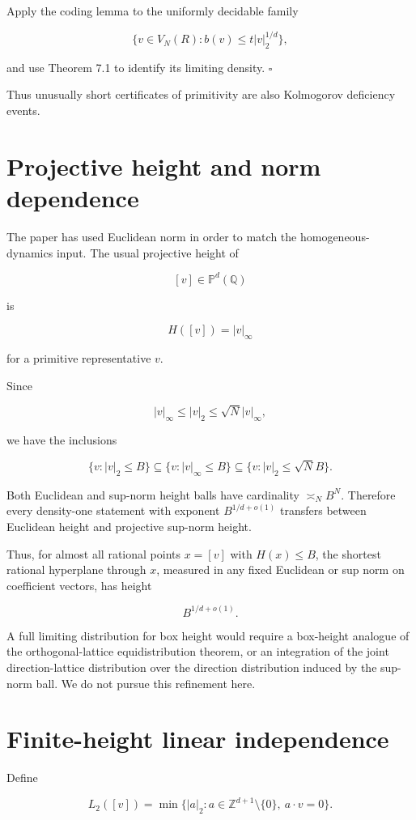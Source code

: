 \documentclass[11pt]{article}
\begin{document}
Apply the coding lemma to the uniformly decidable family

\[
\{v\in V_N(R):b(v)\le t|v|_2^{1/d}\},
\]

and use Theorem 7.1 to identify its limiting density. $\square$

Thus unusually short certificates of primitivity are also Kolmogorov deficiency events.

\section{Projective height and norm dependence}

The paper has used Euclidean norm in order to match the homogeneous-dynamics input. The usual projective height of

\[
[v]\in\mathbb P^d(\mathbb Q)
\]

is

\[
H([v])=|v|_\infty
\]

for a primitive representative $v$.

Since

\[
|v|_\infty\le |v|_2\le \sqrt N|v|_\infty,
\]

we have the inclusions

\[
\{v:|v|_2\le B\}
\subseteq
\{v:|v|_\infty\le B\}
\subseteq
\{v:|v|_2\le \sqrt N B\}.
\]

Both Euclidean and sup-norm height balls have cardinality $\asymp_N B^N$. Therefore every density-one statement with exponent $B^{1/d+o(1)}$ transfers between Euclidean height and projective sup-norm height.

Thus, for almost all rational points $x=[v]$ with $H(x)\le B$, the shortest rational hyperplane through $x$, measured in any fixed Euclidean or sup norm on coefficient vectors, has height

\[
B^{1/d+o(1)}.
\]

A full limiting distribution for box height would require a box-height analogue of the orthogonal-lattice equidistribution theorem, or an integration of the joint direction-lattice distribution over the direction distribution induced by the sup-norm ball. We do not pursue this refinement here.

\section{Finite-height linear independence}

Define

\[
L_2([v])=
\min\{|a|_2:a\in\mathbb Z^{d+1}\setminus\{0\},\ a\cdot v=0\}.
\]
\end{document}
